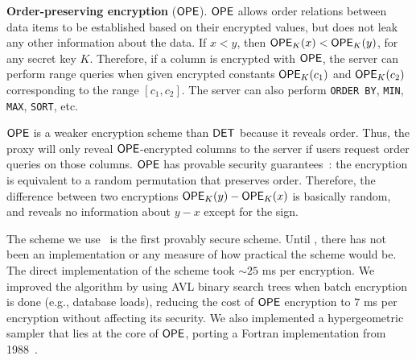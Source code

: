 \textbf{Order-preserving encryption} ($\mathsf{OPE}$)\@. $\mathsf{OPE}$ allows order
relations between data items to be established based on their
encrypted values, but does not leak any other information about the
data. If $x <
y$, then $\mathsf{OPE}_K(x) < \mathsf{OPE}_K(y)$, for any secret key $K$\@.
Therefore, if a column is encrypted with $\mathsf{OPE}$, the server can
perform range queries when given encrypted constants $\mathsf{OPE}_K(c_1)$ and
$\mathsf{OPE}_K(c_2)$ corresponding to the range $[c_1, c_2]$.  The server can
also perform {\tt ORDER BY}, {\tt MIN}, {\tt MAX}, {\tt SORT}, etc.

$\mathsf{OPE}$ is a weaker encryption scheme than $\mathsf{DET}$ because it reveals
order.  Thus, the \name{} proxy will only reveal $\mathsf{OPE}$-encrypted
columns to the server if users request order queries on those
columns. $\mathsf{OPE}$ has provable security guarantees~\cite{boldyreva-ope}: the encryption is
equivalent to a random permutation that preserves order.  Therefore,
the difference between two encryptions $\mathsf{OPE}_K(y) - \mathsf{OPE}_K(x)$ is
basically random, and reveals no information about $y - x$ except for
the sign.

The scheme we use~\cite{boldyreva-ope} is the first provably secure
scheme.  Until \name{}, there has not been an implementation or any
measure of how practical the scheme would be.  The direct
implementation of the scheme took $\sim 25$ ms per encryption.  We
improved the algorithm by using AVL binary search trees when batch
encryption is done (e.g., database loads), reducing the cost of $\mathsf{OPE}$
encryption to $7$ ms per encryption without affecting its security. We
also implemented a hypergeometric sampler that lies at the core of
$\mathsf{OPE}$, porting a Fortran implementation from 1988~\cite{HGD88}.




